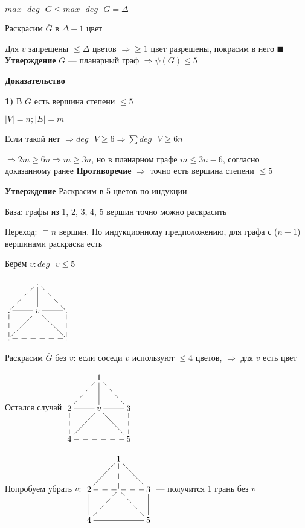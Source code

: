 \documentclass[a4paper, 12pt] {article}
\begin{document}
$ max \text{ } deg \text{ } \bar G \le max \text{ } deg \text{ } G = \Delta$

Раскрасим $ \bar G $ в $ \Delta+1 $ цвет

Для $ v $ запрещены $ \le \Delta $ цветов $ \Rightarrow \ge 1 $ цвет разрешены, покрасим в него $ \blacksquare $\\

\textbf{Утверждение} $ G $ --- планарный граф $ \Rightarrow \psi (G) \le 5 $

\textbf{Доказательство}

\textbf{1)} В $ G $ есть вершина степени $ \le 5 $

$ |V|=n; |E|=m $

Если такой нет $ \Rightarrow deg \text{ } V \ge 6 \Rightarrow \sum deg \text{ } V \ge 6n$

$ \Rightarrow 2m \ge 6n \Rightarrow m \ge 3n $, но в планарном графе $ m \le 3n-6 $, согласно $ \hyperref[eq1]{\text{доказанному ранее}} $ \textbf{Противоречие} $ \Rightarrow $ точно есть вершина степени $ \le 5 $

\textbf{Утверждение} Раскрасим в 5 цветов по индукции

База: графы из 1, 2, 3, 4, 5 вершин точно можно раскрасить

Переход: $ \sqsupset n $ вершин. По индукционному предположению, для графа с ($ n -1$) вершинами раскраска есть

Берём $ v: deg \text{ } v \le 5 $


$\begin{matrix}
	\xymatrix{
		& . \ar@{--}[rd] \ar@{--}[ld]&\\
		. \ar@{--}[d] & v \ar@{-}[u] \ar@{-}[l] \ar@{-}[r] \ar@{-}[ld] \ar@{-}[rd]& . \ar@{--}[d]\\
		. \ar@{--}[rr]  & & . \\
	}
\end{matrix}
$ 

Раскрасим $ \bar G $ без $ v $: если соседи $ v $ используют $ \le 4 $ цветов, $ \Rightarrow $ для $ v $ есть цвет

Остался случай
$\begin{matrix}
	\xymatrix{
		& 1 \ar@{--}[rd] \ar@{--}[ld]&\\
		2 \ar@{--}[d] & v \ar@{-}[u] \ar@{-}[l] \ar@{-}[r] \ar@{-}[ld] \ar@{-}[rd]& 3 \ar@{--}[d]\\
		4 \ar@{--}[rr]  & & 5 \\
	}
\end{matrix}
$ 

Попробуем убрать $ v $:
$\begin{matrix}
	\xymatrix{
		& 1 \ar@{-}[rd] \ar@{-}[ld]&\\
		2 \ar@{-}[d] &   \ar@{--}[u] \ar@{--}[l] \ar@{--}[r] \ar@{--}[ld] \ar@{--}[rd]& 3 \ar@{-}[d]\\
		4 \ar@{-}[rr]  & & 5 \\
	}
\end{matrix}
$ --- получится 1 грань без $ v $ 
\end{document}
